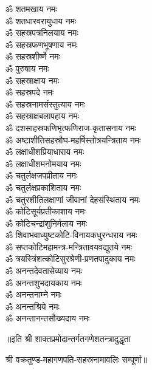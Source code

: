\begin{multicols}{2}
\begin{flushleft}
ॐ शतमखाय नमः\\
ॐ शतधारवरायुधाय नमः\\
ॐ सहस्रपत्रनिलयाय नमः\\
ॐ सहस्रफणभूषणाय नमः\\
ॐ सहस्रशीर्ष्णे नमः\\
ॐ पुरुषाय नमः\\
ॐ सहस्राक्षाय नमः\\
ॐ सहस्रपदे नमः\\
ॐ सहस्रनामसंस्तुत्याय नमः\hfill{}\\
ॐ सहस्राक्षबलापहाय नमः\\
ॐ दशसाहस्रफणिभृत्फणिराज-कृतासनाय नमः\\
ॐ अष्टाशीतिसहस्रौघ-महर्षिस्तोत्रयन्त्रिताय नमः\\
ॐ लक्षाधीशप्रियाधाराय नमः\\
ॐ लक्षाधीशमनोमयाय नमः\\
ॐ चतुर्लक्षजपप्रीताय नमः\\
ॐ चतुर्लक्षप्रकाशिताय नमः\\
ॐ चतुरशीतिलक्षाणां जीवानां देहसंस्थिताय नमः\\
ॐ कोटिसूर्यप्रतीकाशाय नमः\\
ॐ कोटिचन्द्रांशुनिर्मलाय नमः\hfill{}\\
ॐ शिवाभवाध्युष्टकोटि-विनायकधुरन्धराय नमः\\
ॐ सप्तकोटिमहामन्त्र-मन्त्रितावयवद्युतये नमः\\
ॐ त्रयस्त्रिंशत्कोटिसुरश्रेणी-प्रणतपादुकाय नमः\\
ॐ अनन्तदेवतासेव्याय नमः\\
ॐ अनन्तशुभदायकाय नमः\\
ॐ अनन्तनाम्ने नमः\\
ॐ अनन्तश्रिये नमः\\
ॐ अनन्तानन्तसौख्यदाय नमः\\
\end{flushleft}
\end{multicols}
॥इति श्री शाक्तप्रमोदान्तर्गतगणेशतन्त्रादुद्धृता

श्री वक्रतुण्ड-महागणपति-सहस्रनामावलिः सम्पूर्णा॥
